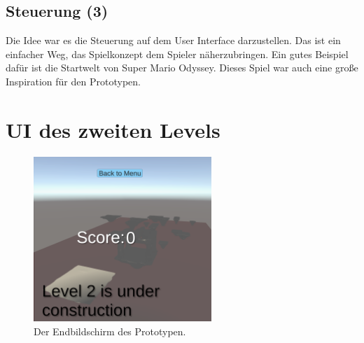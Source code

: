 \subsection{Steuerung (3)}
Die Idee war es die Steuerung auf dem User Interface darzustellen. Das ist ein einfacher Weg, das Spielkonzept dem Spieler näherzubringen. Ein gutes Beispiel dafür ist die Startwelt von Super Mario Odyssey. Dieses Spiel war auch eine große Inspiration für den Prototypen. 


\section{UI des zweiten Levels}

\begin{figure}[h]
    \centering
    \includegraphics[width=0.6\textwidth]{chapters/04/images/V3/Level2Game.png}
    \caption{Der Endbildschirm des Prototypen.}
    \label{fig:UI20}
\end{figure}